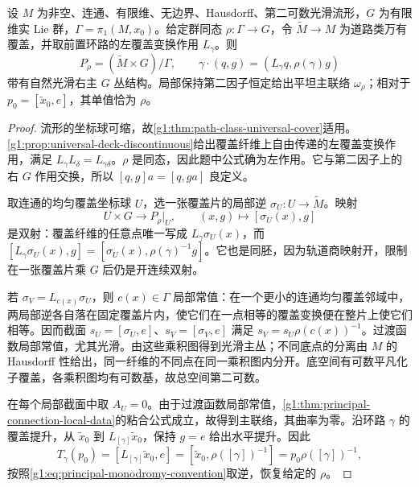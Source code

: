 \begin{theorem}\label{g1:thm:principal-monodromy-construction}
	设 \(M\) 为非空、连通、有限维、无边界、Hausdorff、第二可数光滑流形，\(G\) 为有限维实 Lie 群，\(\Gamma=\pi_1(M,x_0)\)。给定群同态 \(\rho:\Gamma\to G\)，令 \(\widetilde M\to M\) 为道路类万有覆盖，并取前置环路的左覆盖变换作用 \(L_\gamma\)。则
	\begin{equation}\label{g1:eq:flat-principal-representation-quotient}
		P_\rho=(\widetilde M\times G)/\Gamma,
		\qquad \gamma\cdot(q,g)=(L_\gamma q,\rho(\gamma)g)
	\end{equation}
	带有自然光滑右主 \(G\) 丛结构。局部保持第二因子恒定给出平坦主联络 \(\omega_\rho\)；相对于 \(p_0=[\widetilde x_0,e]\)，其单值恰为 \(\rho\)。
\end{theorem}
\begin{proof}
	流形的坐标球可缩，故\cref{g1:thm:path-class-universal-cover}适用。\cref{g1:prop:universal-deck-discontinuous}给出覆盖纤维上自由传递的左覆盖变换作用，满足 \(L_\gamma L_\delta=L_{\gamma\delta}\)。\(\rho\) 是同态，因此题中公式确为左作用。它与第二因子上的右 \(G\) 作用交换，所以 \([q,g]a=[q,ga]\) 良定义。

	取连通的均匀覆盖坐标球 \(U\)，选一张覆盖片的局部逆 \(\sigma_U:U\to\widetilde M\)。映射
	\[
		U\times G\longrightarrow P_\rho|_U,
		\qquad (x,g)\longmapsto[\sigma_U(x),g]
	\]
	是双射：覆盖纤维的任意点唯一写成 \(L_\gamma\sigma_U(x)\)，而 \([L_\gamma\sigma_U(x),g]=[\sigma_U(x),\rho(\gamma)^{-1}g]\)。它也是同胚，因为轨道商映射开，限制在一张覆盖片乘 \(G\) 后仍是开连续双射。

	若 \(\sigma_V=L_{c(x)}\sigma_U\)，则 \(c(x)\in\Gamma\) 局部常值：在一个更小的连通均匀覆盖邻域中，两局部逆各自落在固定覆盖片内，使它们在一点相等的覆盖变换便在整片上使它们相等。因而截面 \(s_U=[\sigma_U,e]\)、\(s_V=[\sigma_V,e]\) 满足 \(s_V=s_U\rho(c(x))^{-1}\)。过渡函数局部常值，尤其光滑。由这些乘积图得到光滑主丛；不同底点的分离由 \(M\) 的 Hausdorff 性给出，同一纤维的不同点在同一乘积图内分开。底空间有可数平凡化子覆盖，各乘积图均有可数基，故总空间第二可数。

	在每个局部截面中取 \(A_U=0\)。由于过渡函数局部常值，\cref{g1:thm:principal-connection-local-data}的粘合公式成立，故得到主联络，其曲率为零。沿环路 \(\gamma\) 的覆盖提升，从 \(\widetilde x_0\) 到 \(L_{[\gamma]}\widetilde x_0\)，保持 \(g=e\) 给出水平提升。因此
	\[
		T_\gamma(p_0)=[L_{[\gamma]}\widetilde x_0,e]
		=[\widetilde x_0,\rho([\gamma])^{-1}]
		=p_0\rho([\gamma])^{-1},
	\]
	按照\eqref{g1:eq:principal-monodromy-convention}取逆，恢复给定的 \(\rho\)。
\end{proof}

